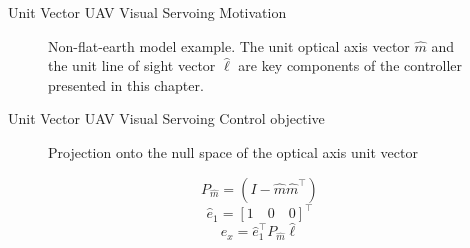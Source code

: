 \documentclass[9pt]{beamer}
\begin{document}
\begin{frame}{Unit Vector UAV Visual Servoing}
Motivation
\begin{figure}[htbp]
	\centering
	\caption{Non-flat-earth model example. The unit optical axis vector $\hat{m}$ and the unit line of sight vector $\hat{\ell}$ are key components of the controller presented in this chapter.}
	\label{nonflatearth}
\end{figure}
\end{frame}

\begin{frame}{Unit Vector UAV Visual Servoing}
Control objective
\begin{figure}[htbp]
	\centering
	\caption{Projection onto the null space of the optical axis unit vector}
	\label{projection}
\end{figure}
$$P_{\hat{m}}=(I-\hat{m}\hat{m}^\top)$$
$$\hat{e}_1=[1 \quad 0 \quad 0]^\top$$
$$e_x=\hat{e}_1^{\top}P_{\hat{m}}\hat{\ell}$$
\end{frame}
\end{document}
